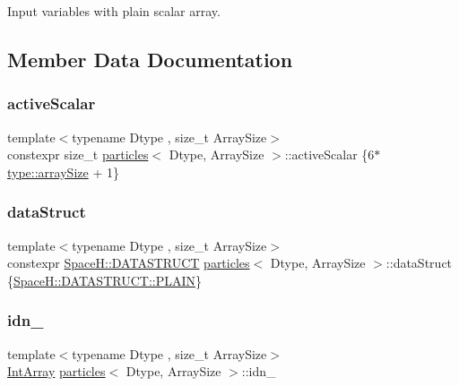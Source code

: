 Input variables with plain scalar array. 



\subsection{Member Data Documentation}
\mbox{\label{classparticles_ae1bbd3d94802cc0b3dc84b473a0115ab}} 
\subsubsection{\texorpdfstring{active\+Scalar}{activeScalar}}
{\footnotesize\ttfamily template$<$typename Dtype , size\+\_\+t Array\+Size$>$ \\
constexpr size\+\_\+t \mbox{\hyperlink{classparticles}{particles}}$<$ Dtype, Array\+Size $>$\+::active\+Scalar \{6$\ast$\mbox{\hyperlink{struct_space_h_1_1_proto_type_a52e6df98534a97aa207f4447abd14d3c}{type\+::array\+Size}} + 1\}\hspace{0.3cm}{\ttfamily [static]}}

\mbox{\label{classparticles_aa22397f7d90ec1ff63a9a8488d68c8f1}} 
\subsubsection{\texorpdfstring{data\+Struct}{dataStruct}}
{\footnotesize\ttfamily template$<$typename Dtype , size\+\_\+t Array\+Size$>$ \\
constexpr \mbox{\hyperlink{namespace_space_h_a4782f089179a3c269891f02482b072df}{Space\+H\+::\+D\+A\+T\+A\+S\+T\+R\+U\+CT}} \mbox{\hyperlink{classparticles}{particles}}$<$ Dtype, Array\+Size $>$\+::data\+Struct \{\mbox{\hyperlink{namespace_space_h_a0af19f79a6498e99dbda772053d44a72af62eb0bf5e5c72e80983fbbac1cb70e5}{Space\+H\+::\+D\+A\+T\+A\+S\+T\+R\+U\+C\+T\+::\+P\+L\+A\+IN}}\}\hspace{0.3cm}{\ttfamily [static]}}

\mbox{\label{classparticles_a4ff05e024ef147c0dbda37ec9f721dd4}} 
\subsubsection{\texorpdfstring{idn\+\_\+}{idn\_}}
{\footnotesize\ttfamily template$<$typename Dtype , size\+\_\+t Array\+Size$>$ \\
\mbox{\hyperlink{classparticles_a1b766bf5ccced2005beaacbb07e46bf9}{Int\+Array}} \mbox{\hyperlink{classparticles}{particles}}$<$ Dtype, Array\+Size $>$\+::idn\+\_\+\hspace{0.3cm}{\ttfamily [protected]}}



